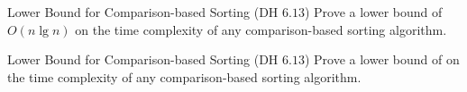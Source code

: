 
\begin{frame}{}
  \begin{center}
  \end{center}

  \pause

\end{frame}

\begin{frame}{}
  \begin{exampleblock}{Lower Bound for Comparison-based Sorting (DH $6.13$)}
    Prove a lower bound of $O(n \lg n)$ on the time complexity 
    of any comparison-based sorting algorithm.
  \end{exampleblock}

  \pause
  \vspace{-0.30cm}

  \pause
  \vspace{-0.30cm}
  \begin{exampleblock}{Lower Bound for Comparison-based Sorting (DH $6.13$)}
    Prove a lower bound of 
    on the time complexity of any comparison-based sorting 
    algorithm.
  \end{exampleblock}
\end{frame}

